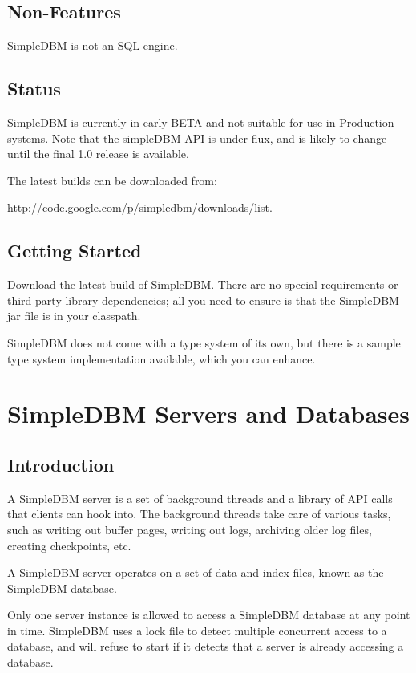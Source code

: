 \documentclass[a4paper,draft,oneside]{book}
\begin{document}
\section{Non-Features}
SimpleDBM is not an SQL engine. 

\section{Status}
SimpleDBM is currently in early BETA and not suitable for use in Production systems. Note that the simpleDBM API is under flux, and is likely to change until the final 1.0 release is available. 

The latest builds can be downloaded from:

http://code.google.com/p/simpledbm/downloads/list.

\section{Getting Started}
Download the latest build of SimpleDBM.
There are no special requirements or third party library dependencies; all you
need to ensure is that the SimpleDBM jar file is in your classpath.

SimpleDBM does not come with a type system of its own, but there is a sample
type system implementation available, which you can enhance. 

\chapter{SimpleDBM Servers and Databases}

\section{Introduction}

A SimpleDBM server is a set of background threads and a library of API
calls that clients can hook into. The background threads take care of
various tasks, such as writing out buffer pages, writing out logs,
archiving older log files, creating checkpoints, etc.

A SimpleDBM server operates on a set of data and index files, known as
the SimpleDBM database.

Only one server instance is allowed to access a SimpleDBM database at
any point in time. SimpleDBM uses a lock file to detect multiple
concurrent access to a database, and will refuse to start if it
detects that a server is already accessing a database.
\end{document}

